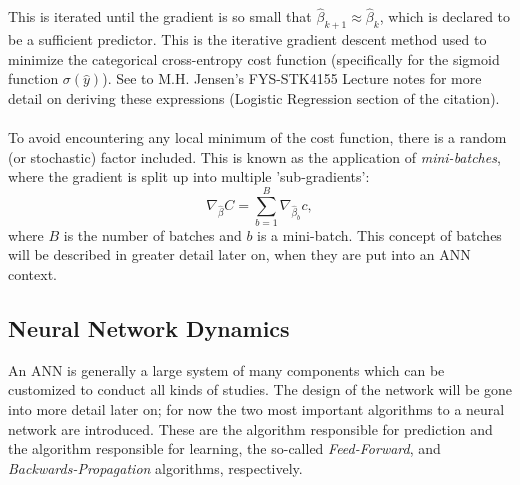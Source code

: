             This is iterated until the gradient is so small that $\hat{\beta}_{k+1} \approx \hat{\beta}_k$, which is declared to be a sufficient predictor. This is the iterative gradient descent method used to minimize the categorical cross-entropy cost function (specifically for the sigmoid function $\sigma (\hat{y})$). See to M.H. Jensen's FYS-STK4155 Lecture notes for more detail on deriving these expressions \cite{lecturenotes} (Logistic Regression section of the citation).\\\\
            To avoid encountering any local minimum of the cost function, there is a random (or stochastic) factor included. This is known as the application of \textit{mini-batches}, where the gradient is split up into multiple 'sub-gradients':
            \begin{equation}
                \nabla_{\hat{\beta}} C = \sum^{B}_{b=1} \nabla_{\hat{\beta}_b} c,
            \end{equation}
            where $B$ is the number of batches and $b$ is a mini-batch. This concept of batches will be described in greater detail later on, when they are put into an ANN context.
    
    \subsection{Neural Network Dynamics}
        An ANN is generally a large system of many components which can be customized to conduct all kinds of studies. The design of the network will be gone into more detail later on; for now the two most important algorithms to a neural network are introduced. These are the algorithm responsible for prediction and the algorithm responsible for learning, the so-called \textit{Feed-Forward}, and \textit{Backwards-Propagation} algorithms, respectively.
